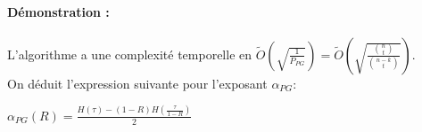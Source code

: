\documentclass[12pt,openany]{report}
\begin{document}
\paragraph{Démonstration :} L’algorithme a une complexité temporelle en $ \tilde{O}\left( \sqrt{\frac{1}{\mathit{P}_{PG}}} \right) =\tilde{O}\left( \sqrt{ \frac{{n \choose t }}{{{n-k} \choose t }} }\right)  $.\\
On déduit l'expression suivante pour l'exposant $ \alpha_{PG}$:
\begin{center}
\begin{boxedminipage}[ poslb ]{7cm}
{\Large
    $ \alpha_{PG}(\mathit{R})=\frac{\mathit{H}(\tau)-(1-\mathit{R})\mathit{H}(\frac{\tau}{1-\mathit{R}})}{2}$
    }
\end{boxedminipage}
\end{center}
\end{document}
